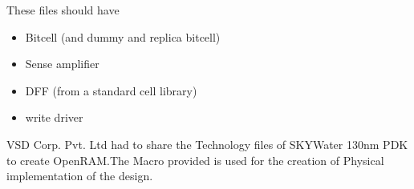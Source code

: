 These files should have 
\begin{itemize}
\item Bitcell (and dummy and replica bitcell)
\item Sense amplifier
\item DFF (from a standard cell library)
\item write driver
\end{itemize}

VSD Corp. Pvt. Ltd had to share the Technology files of SKYWater 130nm PDK to create OpenRAM.The Macro provided is used for the creation of Physical implementation of the design.